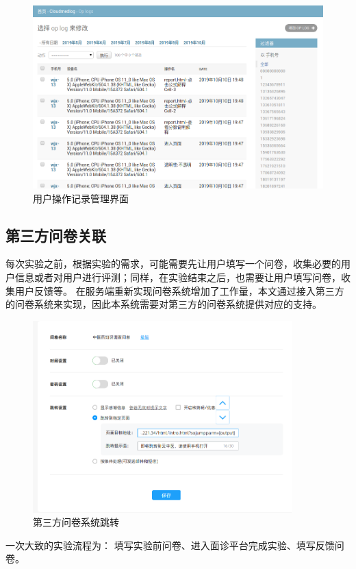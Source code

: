 \begin{figure}[ht]
    \centering
    \includegraphics[width=12cm]{images/op_log.png}
    \caption{用户操作记录管理界面}
    \label{fig:op_log}
\end{figure}

\subsection{第三方问卷关联}
每次实验之前，根据实验的需求，可能需要先让用户填写一个问卷，收集必要的用户信息或者对用户进行评测；同样，在实验结束之后，也需要让用户填写问卷，收集用户反馈等。
在服务端重新实现问卷系统增加了工作量，本文通过接入第三方的问卷系统来实现，因此本系统需要对第三方的问卷系统提供对应的支持。


\begin{figure}[h]
    \centering
    \includegraphics[width=10cm]{images/wjx1.png}
    \caption{第三方问卷系统跳转}
    \label{fig:wjx-ssojump}
\end{figure}

一次大致的实验流程为： 填写实验前问卷、进入面诊平台完成实验、填写反馈问卷。

